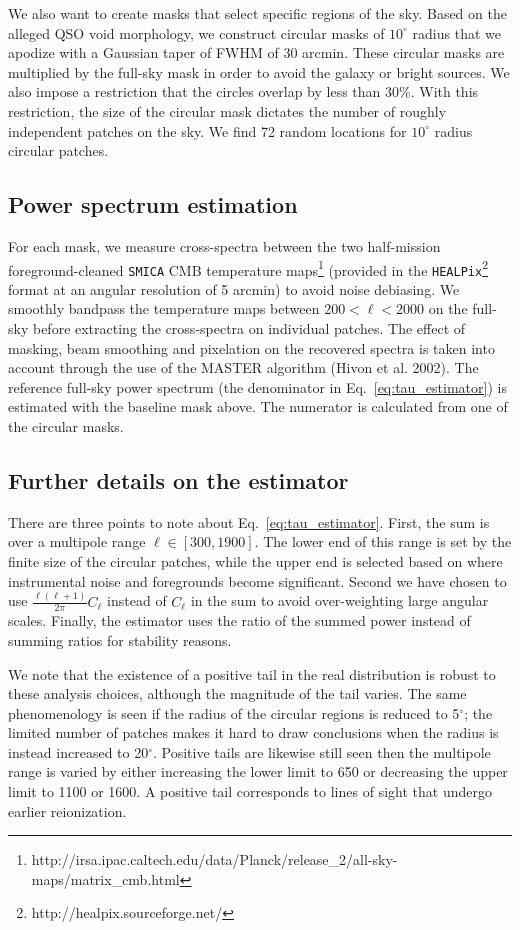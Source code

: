 \documentclass[]{pasa}
\begin{document}
We also want to create masks that select specific regions of the sky.  
Based on the alleged QSO void morphology,  we construct circular masks of $10^\circ$  radius that  we apodize with a Gaussian taper of FWHM of 30 arcmin. 
These circular masks are multiplied by the full-sky mask in order to avoid the galaxy or bright sources. 
We also impose a restriction that the circles overlap by less than 30\%. 
With this restriction, the size of the circular mask dictates the number of roughly independent patches on the sky. 
We find 72 random locations for $10^\circ$  radius circular patches. 



\subsection{Power spectrum estimation}
\label{app:ps-estimation}
For each mask, we measure cross-spectra between the two half-mission foreground-cleaned \texttt{SMICA} CMB temperature maps\footnote{http://irsa.ipac.caltech.edu/data/Planck/release\_2/all-sky-maps/matrix\_cmb.html} (provided in the \texttt{HEALPix}\footnote{http://healpix.sourceforge.net/} format at an angular resolution of 5 arcmin)  to avoid noise debiasing. 
We smoothly bandpass the temperature maps between $200 < \ell < 2000$ on the full-sky before extracting the cross-spectra on individual patches. 
The effect of masking, beam smoothing and pixelation on the recovered spectra is taken into account through the use of the MASTER algorithm (Hivon et al. 2002). 
The reference full-sky power spectrum (the denominator in Eq.~\ref{eq:tau_estimator}) is estimated with the baseline mask above. 
The numerator is calculated from one of the circular masks. 

\subsection{Further details on the estimator} 

There are three points to note about Eq.~\ref{eq:tau_estimator}. 
First, the sum is over a multipole range $\ell \in [300,1900]$. 
The lower end of this range is set by the finite size of the circular patches, while the upper end  is selected based on where instrumental noise and foregrounds become significant. 
Second we have chosen to use $\frac{\ell(\ell+1)}{2\pi} C_\ell$ instead of $C_\ell$ in the sum to avoid over-weighting large angular scales. 
Finally, the estimator uses the ratio of the summed power instead of summing ratios for stability reasons. 

We note that the existence of a positive tail in the real distribution is robust to these analysis choices, although the magnitude of the tail varies. 
The same phenomenology is seen if the radius of the circular regions is reduced to 5$^\circ$; the limited number of patches makes it hard to draw conclusions when the radius is instead increased to 20$^\circ$. 
Positive tails are likewise still seen then the multipole range is varied by either increasing the lower limit to 650 or decreasing the upper limit to 1100 or 1600. 
A positive tail corresponds to lines of sight that undergo earlier reionization. 
\end{document}

